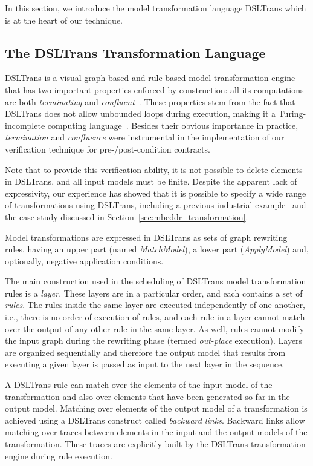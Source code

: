 In this section, we introduce the model transformation language DSLTrans which is at the heart of our technique.

\subsection{The DSLTrans Transformation Language}


DSLTrans is a visual graph-based and rule-based model
transformation engine that has two important properties enforced by construction: all its computations
are both \emph{terminating} and \emph{confluent}~\cite{Barroca2011}.
These properties stem from the fact that DSLTrans does not allow
unbounded loops during execution, making it a Turing-incomplete
computing language~\cite{Barroca2011}. Besides their obvious importance in
practice, \emph{termination} and \emph{confluence} were instrumental in the
implementation of our verification technique for pre-/post-condition contracts.

Note that to provide this verification ability, it is not possible to delete elements in DSLTrans, and all input models must be finite. Despite the apparent lack of expressivity, our experience has showed that it is
possible to specify a wide range of transformations using DSLTrans, including a previous industrial example~\cite{Selim2014} and the case study discussed in Section~\ref{sec:mbeddr_transformation}.

Model transformations are expressed in DSLTrans as sets of graph rewriting
rules, having an upper part (named \emph{MatchModel}), a lower part (\emph{ApplyModel}) and,
optionally, negative application conditions.

The main construction used in the scheduling of DSLTrans model transformation rules is a
\emph{layer}. These layers are in a particular order, and each contains a set of \emph{rules}. The rules inside the same layer are executed independently of one another, i.e., there is no order of execution of rules, and each rule in a layer cannot match over the output of any other rule in the same layer. As well, rules cannot modify the input graph during the rewriting phase (termed \emph{out-place} execution). Layers are organized sequentially and therefore the output model that results from executing a given layer is passed as input to
the next layer in the sequence.

A DSLTrans rule can match over the elements of the input model of the
transformation and also over elements that have been generated so far in the
output model. Matching over elements of the output model of a
transformation is achieved using a DSLTrans construct called \emph{backward
links}. Backward links allow matching over traces between elements in the input and
the output models of the transformation. These traces are explicitly built by
the DSLTrans transformation engine during rule execution.

